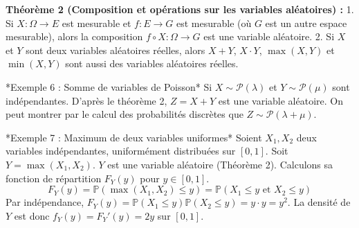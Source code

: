 \documentclass[11pt,a4paper]{article}
\begin{document}
\begin{center}
\end{center}

\textbf{Théorème 2 (Composition et opérations sur les variables aléatoires) :}
1. Si $X : \Omega \to E$ est mesurable et $f : E \to G$ est mesurable (où $G$ est un autre espace mesurable), alors la composition $f \circ X : \Omega \to G$ est une variable aléatoire.
2. Si $X$ et $Y$ sont deux variables aléatoires réelles, alors $X+Y$, $X \cdot Y$, $\max(X, Y)$ et $\min(X, Y)$ sont aussi des variables aléatoires réelles.

*Exemple 6 : Somme de variables de Poisson*
Si $X \sim \mathcal{P}(\lambda)$ et $Y \sim \mathcal{P}(\mu)$ sont indépendantes. D'après le théorème 2, $Z = X + Y$ est une variable aléatoire.
On peut montrer par le calcul des probabilités discrètes que $Z \sim \mathcal{P}(\lambda + \mu)$.

*Exemple 7 : Maximum de deux variables uniformes*
Soient $X_1, X_2$ deux variables indépendantes, uniformément distribuées sur $[0, 1]$. Soit $Y = \max(X_1, X_2)$.
$Y$ est une variable aléatoire (Théorème 2). Calculons sa fonction de répartition $F_Y(y)$ pour $y \in [0,1]$.
$$ F_Y(y) = \mathbb{P}(\max(X_1, X_2) \leq y) = \mathbb{P}(X_1 \leq y \text{ et } X_2 \leq y) $$
Par indépendance, $F_Y(y) = \mathbb{P}(X_1 \leq y)\mathbb{P}(X_2 \leq y) = y \cdot y = y^2$.
La densité de $Y$ est donc $f_Y(y) = F_Y'(y) = 2y$ sur $[0, 1]$.
\end{document}

